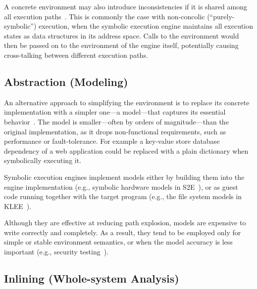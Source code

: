 A concrete environment may also introduce inconsistencies if it is shared among all execution paths~\cite{klee}.
%
This is commonly the case with non-concolic (``purely-symbolic'') execution, when the symbolic execution engine maintains all execution states as data structures in its address space.  Calls to the environment would then be passed on to the environment of the engine itself, potentially causing cross-talking between different execution paths.

\subsection{Abstraction (Modeling)}

An alternative approach to simplifying the environment is to replace its concrete implementation with a simpler one---a model---that captures its essential behavior~\cite{klee,mayhem,aeg}.
%
The model is smaller---often by orders of magnitude---than the original implementation, as it drops non-functional requirements, such as performance or fault-tolerance.  For example a key-value store database dependency of a web application could be replaced with a plain dictionary when symbolically executing it.

Symbolic execution engines implement models either by building them into the engine implementation (e.g., symbolic hardware models in S2E~\cite{s2eSystem}), or as guest code running together with the target program (e.g., the file system models in KLEE~\cite{klee}).

Although they are effective at reducing path explosion, models are expensive to write correctly and completely.  As a result, they tend to be employed only for simple or stable environment semantics, or when the model accuracy is less important (e.g., security testing~\cite{aeg}).


\subsection{Inlining (Whole-system Analysis)}

